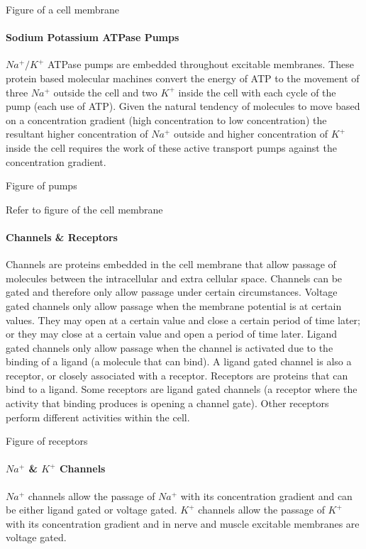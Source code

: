 Figure of a cell membrane

\paragraph{Sodium Potassium ATPase Pumps}
$Na^+/K^+$ ATPase pumps are embedded throughout excitable membranes. These protein based molecular machines convert the energy of ATP to the movement of three $Na^+$ outside the cell and two $K^+$ inside the cell with each cycle of the pump (each use of ATP). Given the natural tendency of molecules to move based on a concentration gradient (high concentration to low concentration) the resultant higher concentration of  $Na^+$ outside and higher concentration of $K^+$ inside the cell requires the work of these active transport pumps against the concentration gradient.

Figure of pumps

Refer to figure of the cell membrane 

\paragraph{Channels \& Receptors}
Channels are proteins embedded in the cell membrane that allow passage of molecules between the intracellular and extra cellular space. Channels can be gated and therefore only allow passage under certain circumstances. 
Voltage gated channels only allow passage when the membrane potential is at certain values. They may open at a certain value and close a certain period of time later; or they may close at a certain value and open a period of time later. 
Ligand gated channels only allow passage when the channel is activated due to the binding of a ligand (a molecule that can bind). A ligand gated channel is also a receptor, or closely associated with a receptor. 
Receptors are proteins that can bind to a ligand. Some receptors are ligand gated channels (a receptor where the activity that binding produces is opening a channel gate). Other receptors perform different activities within the cell. 

Figure of receptors

\paragraph{$Na^+$ \& $K^+$ Channels}

$Na^+$ channels allow the passage of $Na^+$ with its concentration gradient and can be either ligand gated or voltage gated. $K^+$ channels allow the passage of $K^+$ with its concentration gradient and in nerve and muscle excitable membranes are voltage gated. 

